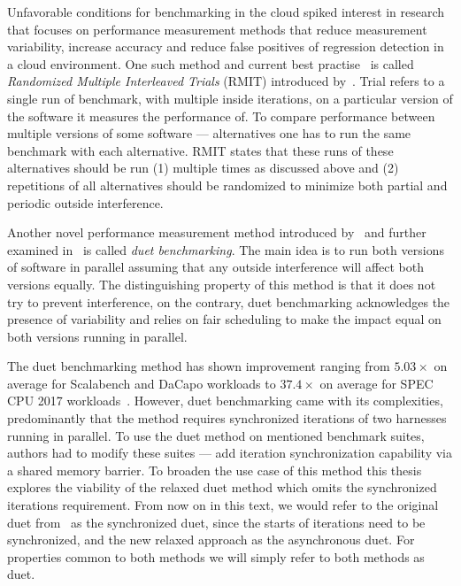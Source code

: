 Unfavorable conditions for benchmarking in the cloud spiked interest in research that focuses on performance measurement methods that reduce measurement variability, increase accuracy and reduce false positives of regression detection in a cloud environment.
One such method and current best practise~\cite{laaber2019software} is called \emph{Randomized Multiple Interleaved Trials} (RMIT) introduced by~\citet{abedi2017conducting}.
Trial refers to a single run of benchmark, with multiple inside iterations, on a particular version of the software it measures the performance of.
To compare performance between multiple versions of some software --- alternatives one has to run the same benchmark with each alternative.
RMIT states that these runs of these alternatives should be run (1) multiple times as discussed above and (2) repetitions of all alternatives should be randomized to minimize both partial and periodic outside interference.

Another novel performance measurement method introduced by~\citet{bulej2019initial} and further examined in~\citet{bulej2020duet} is called \emph{duet benchmarking}.
The main idea is to run both versions of software in parallel assuming that any outside interference will affect both versions equally.
The distinguishing property of this method is that it does not try to prevent interference, on the contrary, duet benchmarking acknowledges the presence of variability and relies on fair scheduling to make the impact equal on both versions running in parallel.

The duet benchmarking method has shown improvement ranging from $5.03 \times$ on average for Scalabench and DaCapo workloads to $37.4 \times$ on average for SPEC CPU 2017 workloads~\cite{bulej2022duet}.
However, duet benchmarking came with its complexities, predominantly that the method requires synchronized iterations of two harnesses running in parallel.
To use the duet method on mentioned benchmark suites, authors had to modify these suites --- add iteration synchronization capability via a shared memory barrier.
To broaden the use case of this method this thesis explores the viability of the relaxed duet method which omits the synchronized iterations requirement.
From now on in this text, we would refer to the original duet from~\citet{bulej2020duet} as the synchronized duet, since the starts of iterations need to be synchronized, and the new relaxed approach as the asynchronous duet.
For properties common to both methods we will simply refer to both methods as duet.
